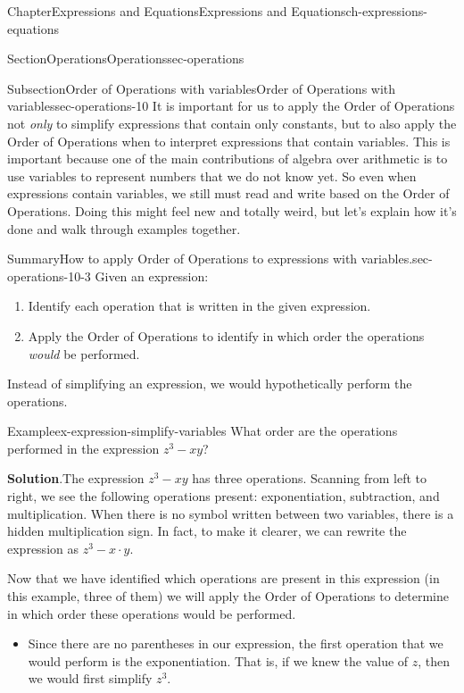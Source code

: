 \documentclass[twoside,11pt,]{book}
\newcommand{\blocktitlefont}{\relax}
\numberwithin{equation}{chapter}
\begin{document}
\begin{chapterptx}{Chapter}{Expressions and Equations}{}{Expressions and Equations}{}{}{ch-expressions-equations}
\begin{sectionptx}{Section}{Operations}{}{Operations}{}{}{sec-operations}
\typeout{************************************************}
%
\begin{subsectionptx}{Subsection}{Order of Operations with variables}{}{Order of Operations with variables}{}{}{sec-operations-10}
It is important for us to apply the Order of Operations not \emph{only} to simplify expressions that contain only constants, but to also apply the Order of Operations when to interpret expressions that contain variables. This is important because one of the main contributions of algebra over arithmetic is to use variables to represent numbers that we do not know yet. So even when expressions contain variables, we still must read and write based on the Order of Operations. Doing this might feel new and totally weird, but let's explain how it's done and walk through examples together.%
\begin{assemblage}{Summary}{How to apply Order of Operations to expressions with variables.}{sec-operations-10-3}%
Given an expression:%
\begin{enumerate}
\item{}Identify each operation that is written in the given expression.%
\item{}Apply the Order of Operations to identify in which order the operations \emph{would} be performed.%
\end{enumerate}
Instead of simplifying an expression, we would hypothetically perform the operations.%
\end{assemblage}
\begin{example}{Example}{}{ex-expression-simplify-variables}%
What order are the operations performed in the expression \(z^3 - xy\)?%
\par\smallskip%
\noindent\textbf{\blocktitlefont Solution}.\hypertarget{ex-expression-simplify-variables-2}{}\quad{}The expression \(z^3 - xy\) has three operations. Scanning from left to right, we see the following operations present: exponentiation, subtraction, and multiplication. When there is no symbol written between two variables, there is a hidden multiplication sign. In fact, to make it clearer, we can rewrite the expression as \(z^3 - x \cdot y\).%
\par
Now that we have identified which operations are present in this expression (in this example, three of them) we will apply the Order of Operations to determine in which order these operations would be performed.%
\begin{itemize}[label=\textbullet]
\item{}Since there are no parentheses in our expression, the first operation that we would perform is the exponentiation. That is, if we knew the value of \(z\), then we would first simplify \(z^3\).%

\end{itemize}
\end{example}
\end{subsectionptx}
\end{sectionptx}
\end{chapterptx}
\end{document}
